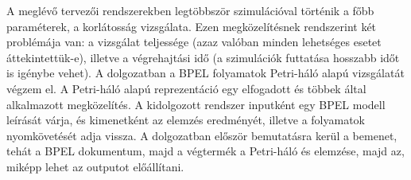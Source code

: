 A meglévő tervezői rendszerekben legtöbbször szimulációval történik a főbb paraméterek, a korlátosság vizsgálata. Ezen megközelítésnek rendszerint két problémája van: a vizsgálat teljessége (azaz valóban minden lehetséges esetet áttekintettük-e), illetve a végrehajtási idő (a szimulációk futtatása hosszabb időt is igénybe vehet).
\newpage
A dolgozatban a BPEL folyamatok Petri-háló alapú vizsgálatát végzem el. A Petri-háló alapú reprezentáció egy elfogadott és többek által alkalmazott megközelítés. A kidolgozott rendszer inputként egy  BPEL modell leírását várja, és kimenetként az elemzés eredményét, illetve a folyamatok nyomkövetését adja vissza. A dolgozatban először bemutatásra kerül a bemenet, tehát a BPEL dokumentum, majd a végtermék a Petri-háló és elemzése, majd az, miképp lehet az outputot előállítani.